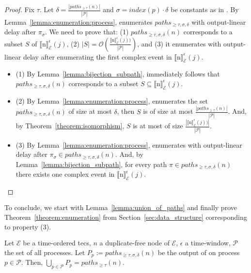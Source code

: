\begin{proof}
  Fix $\tau$. Let $\delta = \frac{|paths_{\ge \tau}(n)|}{|\mathcal{P}|}$ and $\sigma = index(p) \cdot \delta$ be constants as in . By Lemma~\ref{lemma:enumeration:process},  enumerates $paths_{\ge \tau, \sigma, \delta}$ with output-linear delay after $\pi_{\sigma}$. We need to prove that: (1) $paths_{\ge \tau, \sigma, \delta}(n)$ corresponds to a subset $S$ of ${\llbracket \text{n} \rrbracket}^{\epsilon}_{\mathcal{E}}(j)$, (2) $|S| = \mathcal{O}(\frac{{\llbracket \text{n} \rrbracket}^{\epsilon}_{\mathcal{E}}(j))}{|\mathcal{P}|})$, and (3) it enumerates with output-linear delay after enumerating the first complex event in ${\llbracket \text{n} \rrbracket}^{\epsilon}_{\mathcal{E}}(j)$.

 \begin{itemize}
   \item (1) By Lemma~\ref{lemma:bijection_subpath}, immediately follows that $paths_{\ge \tau, \sigma, \delta}(n)$ corresponds to a subset $S \subseteq {\llbracket \text{n} \rrbracket}^{\epsilon}_{\mathcal{E}}(j)$.

   \item (2) By Lemma~\ref{lemma:enumeration:process},  enumerates the set $paths_{\ge \tau, \sigma, \delta}(n)$ of size at most $\delta$, then $S$ is of size at most $\frac{|paths_{\ge \tau}(n)|}{|\mathcal{P}|}$. And, by Theorem~\ref{theorem:isomorphism}, $S$ is at most of size $\frac{|{\llbracket \text{n} \rrbracket}^{\epsilon}_{\mathcal{E}}(j))|}{|\mathcal{P}|}$.

  \item (3) By Lemma~\ref{lemma:enumeration:process},  enumerates with output-linear delay after $\pi_{\sigma} \in paths_{\ge \tau, \sigma, \delta}(n)$. And, by Lemma~\ref{lemma:bijection_subpath}, for every path $\pi \in paths_{\ge \tau, \sigma, \delta}(n)$ there exists one complex event in ${\llbracket \text{n} \rrbracket}^{\epsilon}_{\mathcal{E}}(j)$.
 \end{itemize}

\end{proof}

To conclude, we start with Lemma~\ref{lemma:union_of_paths} and finally prove Theorem~\ref{theorem:enumeration} from Section~\ref{sec:data_structure} corresponding to property (3).

\begin{lemma}\label{lemma:union_of_paths}
  Let $\mathcal{E}$ be a time-ordered \acrshort{tecs}, $n$ a duplicate-free node of $\mathcal{E}$, $\epsilon$ a time-window, $\mathcal{P}$ the set of all processes. Let $P_{p} := paths_{\ge \tau, \sigma, \delta}(n)$ be the output of  on process $p \in \mathcal{P}$. Then, $\bigcup\limits_{p \in \mathcal{P}} P_{p} = paths_{\ge \tau}(n)$.
\end{lemma}

